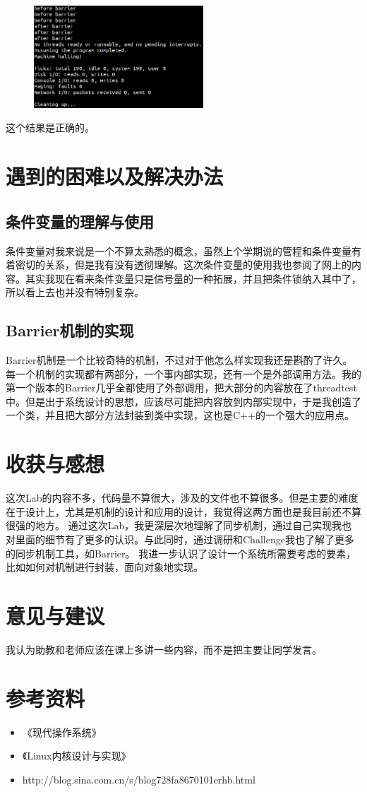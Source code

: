 \documentclass{ctexart}
\begin{document}
\begin{figure}[h!]
\includegraphics[width=2.5in]{e32.png}
\end{figure}

这个结果是正确的。

\section{遇到的困难以及解决办法}
\subsection*{条件变量的理解与使用}
条件变量对我来说是一个不算太熟悉的概念，虽然上个学期说的管程和条件变量有着密切的关系，但是我有没有透彻理解。这次条件变量的使用我也参阅了网上的内容。其实我现在看来条件变量只是信号量的一种拓展，并且把条件锁纳入其中了，所以看上去也并没有特别复杂。
\subsection*{Barrier机制的实现}
Barrier机制是一个比较奇特的机制，不过对于他怎么样实现我还是斟酌了许久。每一个机制的实现都有两部分，一个事内部实现，还有一个是外部调用方法。我的第一个版本的Barrier几乎全都使用了外部调用，把大部分的内容放在了threadtest中。但是出于系统设计的思想，应该尽可能把内容放到内部实现中，于是我创造了一个类，并且把大部分方法封装到类中实现，这也是C++的一个强大的应用点。

\section{收获与感想}

这次Lab的内容不多，代码量不算很大，涉及的文件也不算很多。但是主要的难度在于设计上，尤其是机制的设计和应用的设计，我觉得这两方面也是我目前还不算很强的地方。
通过这次Lab，我更深层次地理解了同步机制，通过自己实现我也对里面的细节有了更多的认识。与此同时，通过调研和Challenge我也了解了更多的同步机制工具，如Barrier。
我进一步认识了设计一个系统所需要考虑的要素，比如如何对机制进行封装，面向对象地实现。

\section{意见与建议}
我认为助教和老师应该在课上多讲一些内容，而不是把主要让同学发言。

\section{参考资料}
\begin{itemize}
\item 《现代操作系统》
\item 《Linux内核设计与实现》
\item  http://blog.sina.com.cn/s/blog728fa8670101erhb.html
\end{itemize}
\end{document}
